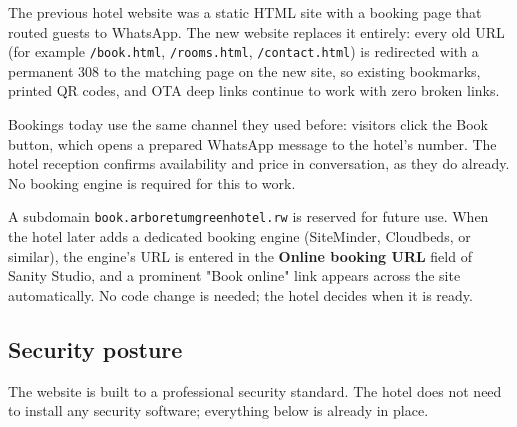 \documentclass[11pt,a4paper]{article}
\begin{document}
The previous hotel website was a static HTML site with a booking page that routed guests to WhatsApp. The new website replaces it entirely: every old URL (for example \texttt{/book.html}, \texttt{/rooms.html}, \texttt{/contact.html}) is redirected with a permanent 308 to the matching page on the new site, so existing bookmarks, printed QR codes, and OTA deep links continue to work with zero broken links.

Bookings today use the same channel they used before: visitors click the Book button, which opens a prepared WhatsApp message to the hotel's number. The hotel reception confirms availability and price in conversation, as they do already. No booking engine is required for this to work.

A subdomain \texttt{book.\allowbreak arboretumgreenhotel.\allowbreak rw} is reserved for future use. When the hotel later adds a dedicated booking engine (SiteMinder, Cloudbeds, or similar), the engine's URL is entered in the \textbf{Online booking URL} field of Sanity Studio, and a prominent "Book online" link appears across the site automatically. No code change is needed; the hotel decides when it is ready.

\subsection{Security posture}

The website is built to a professional security standard. The hotel does not need to install any security software; everything below is already in place.
\end{document}
